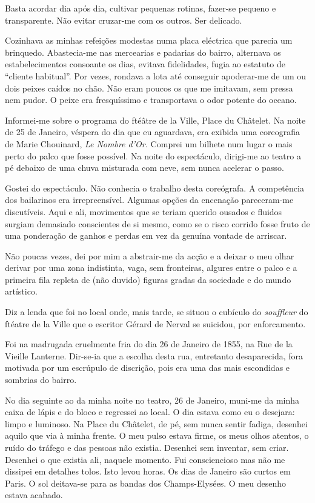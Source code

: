Basta acordar dia após dia, cultivar pequenas rotinas,
fazer-se pequeno e transparente. Não evitar cruzar-me com os outros. Ser
delicado.

Cozinhava as minhas refeições modestas numa placa eléctrica que
parecia um brinquedo. Abastecia-me nas mercearias e padarias do bairro,
alternava os estabelecimentos consoante os dias, evitava fidelidades,
fugia ao estatuto de ``cliente habitual''. Por vezes, rondava a lota
até conseguir apoderar-me de um ou dois peixes caídos no chão. Não eram
poucos os que me imitavam, sem pressa nem pudor. O peixe era
fresquíssimo e transportava o odor potente do oceano.

Informei-me sobre o programa do ftéâtre de la Ville, Place du Châtelet.
Na noite de 25 de Janeiro, véspera do dia que eu aguardava, era exibida
uma coreografia de Marie Chouinard, \emph{Le Nombre d'Or. }Comprei um
bilhete num lugar o mais perto do palco que fosse possível. Na noite do
espectáculo, dirigi-me ao teatro a pé debaixo de uma chuva misturada com
neve, sem nunca acelerar o passo.

Gostei do espectáculo. Não conhecia o trabalho desta coreógrafa. A
competência dos bailarinos era irrepreensível. Algumas opções da
encenação pareceram-me discutíveis. Aqui e ali, movimentos que se teriam
querido ousados e fluidos surgiam demasiado conscientes de si mesmo,
como se o risco corrido fosse fruto de uma ponderação de ganhos e
perdas em vez da genuína vontade de arriscar.

Não poucas vezes, dei por mim a abstrair-me da acção e a deixar o meu
olhar derivar por uma zona indistinta, vaga, sem fronteiras, algures
entre o palco e a primeira fila repleta de (não duvido) figuras gradas
da sociedade e do mundo artístico.

Diz a lenda que foi no local onde, mais tarde, se situou o cubículo do
\emph{souffleur }do ftéatre de la Ville que o escritor Gérard de Nerval
se suicidou, por enforcamento.

Foi na madrugada cruelmente fria do dia 26 de Janeiro de 1855, na Rue de
la Vieille Lanterne. Dir-se-ia que a escolha desta rua, entretanto
desaparecida, fora motivada por um escrúpulo de discrição, pois era uma
das mais escondidas e sombrias do bairro.

No dia seguinte ao da minha noite no teatro, 26 de Janeiro, muni-me da
minha caixa de lápis e do bloco e regressei ao local. O dia estava como
eu o desejara: limpo e luminoso. Na Place du Châtelet, de pé, sem nunca
sentir fadiga, desenhei aquilo que via à minha frente. O meu pulso
estava firme, os meus olhos atentos, o ruído do tráfego e das pessoas
não existia. Desenhei sem inventar, sem criar. Desenhei o que existia
ali, naquele momento. Fui consciencioso mas não me dissipei em detalhes
tolos. Isto levou horas. Os dias de Janeiro são curtos em Paris. O sol
deitava-se para as bandas dos Champs-Elysées. O meu desenho estava acabado.

